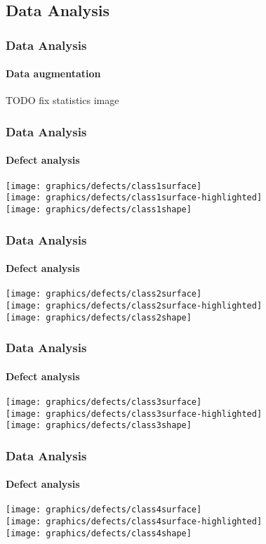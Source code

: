 \subsection{Data Analysis}

    \begin{frame}
        \frametitle{Data Analysis}
        \framesubtitle{Data augmentation}
        TODO fix statistics image
    \end{frame}

    \begin{frame}
        \frametitle{Data Analysis}
        \framesubtitle{Defect analysis}
        \texttt{[image: graphics/defects/class1surface]}\\
        \texttt{[image: graphics/defects/class1surface-highlighted]}\\
        \texttt{[image: graphics/defects/class1shape]}
    \end{frame}

    \begin{frame}
        \frametitle{Data Analysis}
        \framesubtitle{Defect analysis}
        \texttt{[image: graphics/defects/class2surface]}\\
        \texttt{[image: graphics/defects/class2surface-highlighted]}\\
        \texttt{[image: graphics/defects/class2shape]}
    \end{frame}

    \begin{frame}
        \frametitle{Data Analysis}
        \framesubtitle{Defect analysis}
        \texttt{[image: graphics/defects/class3surface]}\\
        \texttt{[image: graphics/defects/class3surface-highlighted]}\\
        \texttt{[image: graphics/defects/class3shape]}
    \end{frame}

    \begin{frame}
        \frametitle{Data Analysis}
        \framesubtitle{Defect analysis}
        \texttt{[image: graphics/defects/class4surface]}\\
        \texttt{[image: graphics/defects/class4surface-highlighted]}\\
        \texttt{[image: graphics/defects/class4shape]}
    \end{frame}